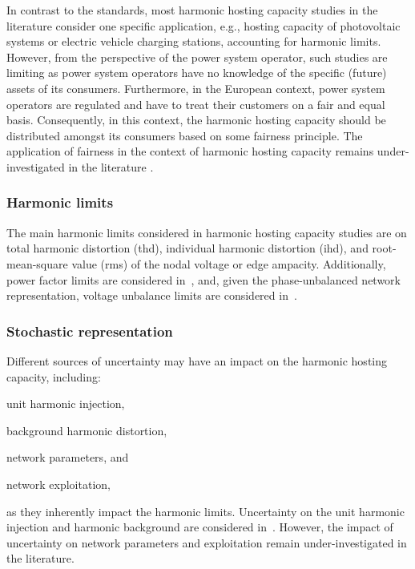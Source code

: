 In contrast to the standards, most harmonic hosting capacity studies in the literature consider one specific application, e.g., hosting capacity of photovoltaic systems or electric vehicle charging stations, accounting for harmonic limits. However, from the perspective of the power system operator, such studies are limiting as power system operators have no knowledge of the specific (future) assets of its consumers. Furthermore, in the European context, power system operators are regulated and have to treat their customers on a fair and equal basis. Consequently, in this context, the harmonic hosting capacity should be distributed amongst its consumers based on some fairness principle. The application of fairness in the context of harmonic hosting capacity remains under-investigated in the literature \cite{santos_considerations_2015}.

\subsubsection{Harmonic limits}
\label{sec:harmonic_limits}

The main harmonic limits considered in harmonic hosting capacity studies are on total harmonic distortion (thd), individual harmonic distortion (ihd), and root-mean-square value (rms) of the nodal voltage or edge ampacity. Additionally, power factor limits are considered in~\cite{sakar_integration_2018}, and, given the phase-unbalanced network representation, voltage unbalance limits are considered in~\cite{carmelito_hosting_2023}.

\subsubsection{Stochastic representation}
\label{sec:stochastic_representation}

Different sources of uncertainty may have an impact on the harmonic hosting capacity, including: 
\begin{enumerate*}
    \item [(a)] unit harmonic injection,
    \item [(b)] background harmonic distortion,
    \item [(c)] network parameters, and
    \item [(d)] network exploitation, 
\end{enumerate*}
as they inherently impact the harmonic limits. Uncertainty on the unit harmonic injection and harmonic background are considered in~\cite{ sun_distribution_2022, nakhodchi_impact_2023, sakar_integration_2018, sun_distribution_2012, sun_incorporating_2012}. However, the impact of uncertainty on network parameters and exploitation remain under-investigated in the literature.

